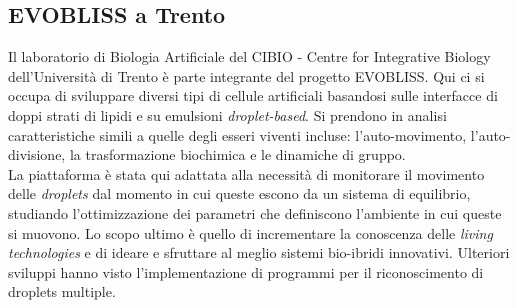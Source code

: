 \subsection{EVOBLISS a Trento}
\label{sec:trento}
Il laboratorio di Biologia Artificiale del CIBIO - Centre for Integrative Biology dell'Università di Trento è parte integrante del progetto EVOBLISS.
Qui ci si occupa di sviluppare diversi tipi di cellule artificiali basandosi sulle interfacce di doppi strati di lipidi e su emulsioni \emph{droplet-based}. Si prendono in analisi caratteristiche simili a quelle degli esseri viventi incluse: l'auto-movimento, l'auto-divisione, la trasformazione biochimica e le dinamiche di gruppo.
\\La piattaforma è stata qui adattata alla necessità di monitorare il movimento delle \emph{droplets} dal momento in cui queste escono da un sistema di equilibrio, studiando l'ottimizzazione dei parametri che definiscono l'ambiente in cui queste si muovono. Lo scopo ultimo è quello di incrementare la conoscenza delle \emph{living technologies} e di ideare e sfruttare al meglio sistemi bio-ibridi innovativi.
Ulteriori sviluppi hanno visto l'implementazione di programmi per il riconoscimento di droplets multiple. 
 















